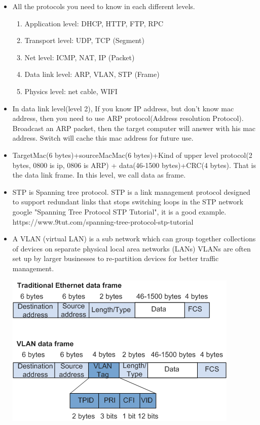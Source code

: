 \documentclass[a4paper,11pt,twoside]{book}
\begin{document}
\begin{itemize}
	\item All the protocols you need to know in each different levels.
	\begin{enumerate}
		\item Application level: DHCP, HTTP, FTP, RPC
		\item Transport  level: UDP, TCP (Segment)
		\item Net level: ICMP,  NAT, IP (Packet)
		\item Data link level: ARP, VLAN, STP (Frame)
		\item Physics level: net cable, WIFI
	\end{enumerate}

	\item In data link level(level 2), If you know IP address, but don't know mac address, then you need to use ARP protocol(Address resolution Protocol). Broadcast an ARP packet, then the target computer will answer with his mac address. Switch will cache this mac address for future use.
	
	\item TargetMac(6 bytes)+sourceMacMac(6 bytes)+Kind of upper level protocol(2 bytes, 0800 is ip, 0806 is ARP) + data(46-1500 bytes)+CRC(4 bytes). That is the data link frame. In this level, we call data as frame. 
	
	\item STP is Spanning tree protocol. STP is a link management protocol designed to support redundant links that stops switching loops in the STP network google "Spanning Tree Protocol STP Tutorial", it is a good example.
	https://www.9tut.com/spanning-tree-protocol-stp-tutorial
	
	\item A VLAN (virtual LAN) is a sub network which can group together collections of devices on separate physical local area networks (LANs) VLANs are often set up by larger businesses to re-partition devices for better traffic management.
	
	\begin{center}
	\includegraphics[width=0.65\linewidth]{pics/vlan.png}
	\end{center}
	

\end{itemize}
\end{document}
